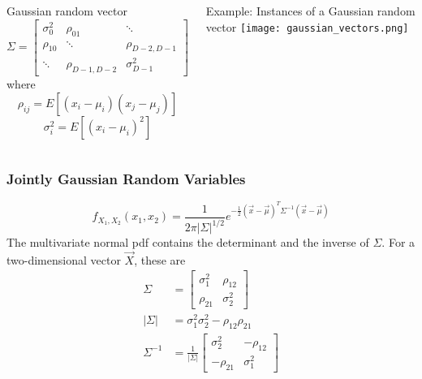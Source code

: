 \documentclass{beamer}
\begin{document}
\begin{frame}
  \begin{columns}
    \column{2.25in}
    \begin{block}{Gaussian random vector}
      \[
      \Sigma= \left[\begin{array}{ccc}
          \sigma_0^2 & \rho_{01} & \ddots\\
          \rho_{10} & \ddots &  \rho_{D-2,D-1}\\
          \ddots & \rho_{D-1,D-2} &  \sigma_{D-1}^2\end{array}\right]
      \]
      where
      \[
      \rho_{ij}=E[(x_i-\mu_i)(x_j-\mu_j)]
      \]
      \[
      \sigma_{i}^2=E[(x_i-\mu_i)^2]
      \]
    \end{block}
    \column{2in}
    \begin{block}{Example: Instances of a Gaussian random vector}
      \texttt{[image: gaussian\_vectors.png]}
    \end{block}
  \end{columns}
\end{frame}

\begin{frame}
  \frametitle{Jointly Gaussian Random Variables}
  \[
  f_{X_1,X_2}(x_1,x_2) = \frac{1}{2\pi|\Sigma|^{1/2}}
  e^{-\frac{1}{2}(\vec{x}-\vec\mu)^T\Sigma^{-1}(\vec{x}-\vec\mu)}
  \]
  The multivariate normal pdf contains the determinant and the inverse of $\Sigma$.
  For a two-dimensional vector $\vec{X}$, these are
  \begin{align*}
    \Sigma &= \left[\begin{array}{cc}\sigma_1^2 & \rho_{12} \\\rho_{21} & \sigma_2^2\end{array}\right]\\
    |\Sigma| &=\sigma_1^2\sigma_2^2 - \rho_{12}\rho_{21}\\
    \Sigma^{-1} &= \frac{1}{|\Sigma|}\left[\begin{array}{cc}
        \sigma_2^2 & -\rho_{12}\\-\rho_{21} & \sigma_1^2\end{array}\right]
  \end{align*}
\end{frame}  
  
\end{document}
